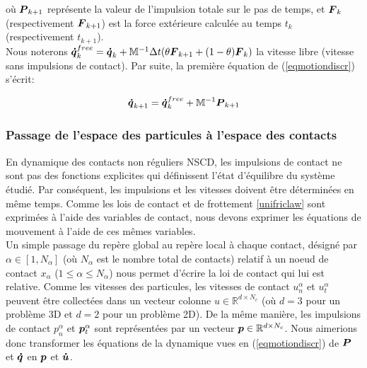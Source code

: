 où $\mbox{\boldmath{$P$}}_{k+1}$ représente la valeur de l'impulsion totale sur le pas de temps, et $\mbox{\boldmath{$F$}}_k$ (respectivement $\mbox{\boldmath{$F$}}_{k+1}$) est la force extérieure calculée au temps $t_k$ (respectivement $t_{k+1}$).\\
Nous noterons $\boldsymbol{\dot{q}}_{k}^{free} = \boldsymbol{\dot{q}}_{k} + \mathbb{M}^{-1} \Delta{t}(\theta \mbox{\boldmath{$F$}}_{k+1} + (1 - \theta) \mbox{\boldmath{$F$}}_{k})$ la vitesse libre (vitesse sans impulsions de contact). Par suite, la première équation de (\ref{eqmotiondiscr}) s'écrit:

\begin{equation}
\boldsymbol{\dot{q}}_{k+1} = \boldsymbol{\dot{q}}_{k}^{free} + \mathbb{M}^{-1} \mbox{\boldmath{$P$}}_{k+1}
\label{freevel}
\end{equation}

\subsubsection{Passage de l'espace des particules à l'espace des contacts}

En dynamique des contacts non réguliers NSCD, les impulsions de contact ne sont pas des fonctions explicites qui définissent l'état d'équilibre du système étudié. Par conséquent, les impulsions et les vitesses doivent être déterminées en même temps. Comme les lois de contact et de frottement \ref{unifriclaw} sont exprimées à l'aide des variables de contact, nous devons exprimer les équations de mouvement à l'aide de ces mêmes variables.\\
Un simple passage du repère global au repère local à chaque contact, désigné par $\alpha \in [1,N_{\alpha}]$ (où $N_{\alpha}$ est le nombre total de contacts) relatif à un noeud de contact $x_{\alpha}$ ($1 \leq \alpha \leq N_{\alpha}$) nous permet d'écrire la loi de contact qui lui est relative. Comme les vitesses des particules, les vitesses de contact $u^{\alpha}_n$ et $u^{\alpha}_t$ peuvent être collectées dans un vecteur colonne $u \in \mathbb{R}^{d \times N_c}$ (où $d = 3$ pour un problème 3D et $d = 2$ pour un problème 2D). De la même manière, les impulsions de contact $p^{\alpha}_n$ et $\boldsymbol{p}^{\alpha}_t$ sont représentées par un vecteur $\boldsymbol{p} \in \mathbb{R}^{d \times N_c}$. Nous aimerions donc transformer les équations de la dynamique vues en (\ref{eqmotiondiscr}) de $\boldsymbol{P}$ et $\boldsymbol{\dot{q}}$ en $\boldsymbol{p}$ et $\boldsymbol{\dot{u}}$.\\

